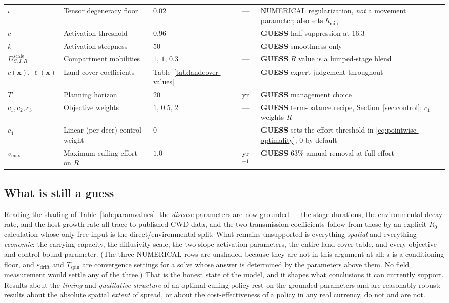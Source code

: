 \documentclass[11pt]{article}
\newcommand{\tagGUESS}{{\footnotesize\textsf{\textbf{\textcolor{red!70!black}{GUESS}}}}}
\newcommand{\tagNUM}{{\footnotesize\textsf{\textcolor{purple!70!black}{NUMERICAL}}}}
\newcommand{\guessrow}{\rowcolor{guessbg}}
\begin{document}
\begin{table}[h]
\begin{tabular}{@{}llllp{4.6cm}@{}}
$\iota$ & Tensor degeneracy floor & $0.02$ & --- & \tagNUM{} regularization, \emph{not} a movement parameter; also sets $h_{\min}$ \\
\guessrow $c$ & Activation threshold & $0.96$ & --- & \tagGUESS{} half-suppression at $16.3^\circ$ \\
\guessrow $k$ & Activation steepness & $50$ & --- & \tagGUESS{} smoothness only \\
\guessrow $D_{S,I,R}^{\text{scale}}$ & Compartment mobilities & $1,\,1,\,0.3$ & --- & \tagGUESS{} $R$ value is a lumped-stage blend \\
\guessrow $c(\mathbf{x}),\ \ell(\mathbf{x})$ & Land-cover coefficients & Table~\ref{tab:landcover-values} & --- & \tagGUESS{} expert judgement throughout \\
\guessrow $T$ & Planning horizon & $20$ & yr & \tagGUESS{} management choice \\
\guessrow $c_1,c_2,c_3$ & Objective weights & $1,\,0.5,\,2$ & --- & \tagGUESS{} term-balance recipe, Section~\ref{sec:control}; $c_1$ weights $R$ \\
\guessrow $c_4$ & Linear (per-deer) control weight & $0$ & --- & \tagGUESS{} sets the effort threshold in \eqref{eq:pointwise-optimality}; $0$ by default \\
\guessrow $v_{\max}$ & Maximum culling effort on $R$ & $1.0$ & yr$^{-1}$ & \tagGUESS{} $63\%$ annual removal at full effort \\
\bottomrule
\end{tabular}
\end{table}

\subsection{What is still a guess}

Reading the shading of Table~\ref{tab:paramvalues}: the \emph{disease} parameters are now grounded --- the stage durations, the environmental decay rate, and the host growth rate all trace to published CWD data, and the two transmission coefficients follow from those by an explicit $R_0$ calculation whose only free input is the direct/environmental split. What remains unsupported is everything \emph{spatial} and everything \emph{economic}: the carrying capacity, the diffusivity scale, the two slope-activation parameters, the entire land-cover table, and every objective and control-bound parameter. (The three \tagNUM{} rows are unshaded because they are not in this argument at all: $\iota$ is a conditioning floor, and $\varepsilon_{\text{drift}}$ and $T_{\text{spin}}$ are convergence settings for a solve whose answer is determined by the parameters above them. No field measurement would settle any of the three.) That is the honest state of the model, and it shapes what conclusions it can currently support. Results about the \emph{timing} and \emph{qualitative structure} of an optimal culling policy rest on the grounded parameters and are reasonably robust; results about the absolute spatial \emph{extent} of spread, or about the cost-effectiveness of a policy in any real currency, do not and are not.
\end{document}
